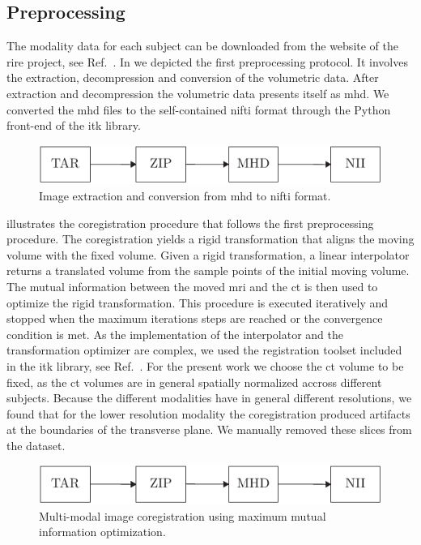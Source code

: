 \subsection{Preprocessing}

The modality data for each subject can be downloaded from the website of the
\gls{rire} project, see Ref.~\cite{RIRE}. In  we depicted
the first preprocessing protocol. It involves the extraction, decompression and
conversion of the volumetric data. After extraction and decompression the
volumetric data presents itself as \gls{mhd}. We converted the \gls{mhd} files
to the self-contained \gls{nifti} format through the Python front-end of the
\gls{itk} library.
\begin{figure}[h]
  \centering
  \includegraphics[page=1,width=.8\linewidth]{figure/diagrams.pdf}
  \caption{Image extraction and conversion from \gls{mhd} to \gls{nifti}
		format.
	}\label{fig:conversion}
\end{figure}
 illustrates the coregistration procedure that follows
the first preprocessing procedure. The coregistration yields a rigid
transformation that aligns the moving volume with the fixed volume. Given a
rigid transformation, a linear interpolator returns a translated volume from
the sample points of the initial moving volume. The mutual information between
the moved \gls{mri} and the \gls{ct} is then used to optimize the
rigid transformation. This procedure is executed iteratively and stopped when
the maximum iterations steps are reached or the convergence condition is met.
As the implementation of the interpolator and the transformation optimizer
are complex, we used the registration toolset included in the \gls{itk}
library, see Ref.~\cite{Yaniv2018}.
For the present work we choose the \gls{ct} volume to be fixed, as the
\gls{ct} volumes are in general spatially normalized accross different
subjects. Because the different modalities have in general different
resolutions, we found that for the lower resolution modality the
coregistration produced artifacts at the boundaries of the transverse plane.
We manually removed these slices from the dataset.
\begin{figure}[h]
  \centering
  \includegraphics[page=2,width=.8\linewidth]{figure/diagrams.pdf}
  \caption{Multi-modal image coregistration using maximum mutual information
    optimization.
	}\label{fig:registration}
\end{figure}
